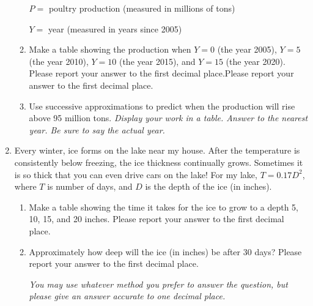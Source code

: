 \documentclass[12pt]{article}
\begin{document}
\begin{enumerate}
\begin{enumerate}
\quad $P= $ poultry production (measured in millions of tons)

\quad $Y = $ year (measured in years since 2005)

\vfill
\item Make a table showing the production when $Y=0$ (the year 2005), $Y=5$ (the year 2010), $Y=10$ (the year 2015), and $Y=15$ (the year 2020). Please report your answer to the first decimal place.Please report your answer to the first decimal place.
\vfill

\item Use successive approximations to predict when the production will rise above 95 million tons.  \emph{Display your work in a table.  Answer to the nearest year.  Be sure to say the actual year.}
\vfill
\vfill
\end{enumerate}

\newpage
\item Every winter, ice forms on the lake near my house.  After the temperature is consistently below freezing, the ice thickness continually grows.  Sometimes it is so thick that you can even drive cars on the lake!  For my lake, $T=0.17D^2$, where $T$ is number of days, and $D$ is the depth of the ice (in inches). 
\begin{enumerate}
\item Make a table showing the time it takes for the ice to grow to a depth 5, 10, 15, and 20 inches.  Please report your answer to the first decimal place.
\vfill
\item Approximately how deep will the ice (in inches) be after 30 days? Please report your answer to the first decimal place.

\emph{You may use whatever method you prefer to answer the question, but please give an answer accurate to one decimal place.}
\vfill
\end{enumerate}


\end{enumerate}
\end{document}
